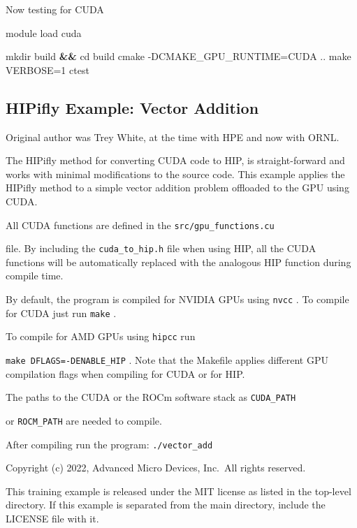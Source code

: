 \documentclass[
]{article}
\let\oldtexttt\texttt
\renewcommand{\texttt}[1]{
  \colorbox{Light}{\oldtexttt{#1}}
}
\newenvironment{Shaded}{}{}
\newcommand{\BuiltInTok}[1]{#1}
\newcommand{\ExtensionTok}[1]{#1}
\newcommand{\FunctionTok}[1]{\textcolor[rgb]{0.02,0.16,0.49}{#1}}
\newcommand{\KeywordTok}[1]{\textcolor[rgb]{0.00,0.44,0.13}{\textbf{#1}}}
\newcommand{\NormalTok}[1]{#1}
\begin{document}
Now testing for CUDA

\begin{Shaded}
\begin{Highlighting}[]
\ExtensionTok{module}\NormalTok{ load cuda}

\FunctionTok{mkdir}\NormalTok{ build }\KeywordTok{\&\&} \BuiltInTok{cd}\NormalTok{ build}
\FunctionTok{cmake}\NormalTok{ {-}DCMAKE\_GPU\_RUNTIME=CUDA ..}
\FunctionTok{make}\NormalTok{ VERBOSE=1}
\ExtensionTok{ctest}
\end{Highlighting}
\end{Shaded}

\hypertarget{hipifly-example-vector-addition}{%
\subsection{HIPifly Example: Vector
Addition}\label{hipifly-example-vector-addition}}

Original author was Trey White, at the time with HPE and now with ORNL.

The HIPifly method for converting CUDA code to HIP, is straight-forward
and works with minimal modifications to the source code. This example
applies the HIPifly method to a simple vector addition problem offloaded
to the GPU using CUDA.

All CUDA functions are defined in the \texttt{src/gpu\_functions.cu}
file. By including the \texttt{cuda\_to\_hip.h} file when using HIP, all
the CUDA functions will be automatically replaced with the analogous HIP
function during compile time.

By default, the program is compiled for NVIDIA GPUs using \texttt{nvcc}.
To compile for CUDA just run \texttt{make}.

To compile for AMD GPUs using \texttt{hipcc} run
\texttt{make\ DFLAGS=-DENABLE\_HIP}. Note that the Makefile applies
different GPU compilation flags when compiling for CUDA or for HIP.

The paths to the CUDA or the ROCm software stack as \texttt{CUDA\_PATH}
or \texttt{ROCM\_PATH} are needed to compile.

After compiling run the program: \texttt{./vector\_add}

\pagebreak

Copyright (c) 2022, Advanced Micro Devices, Inc.~All rights reserved.

This training example is released under the MIT license as listed in the
top-level directory. If this example is separated from the main
directory, include the LICENSE file with it.
\end{document}
